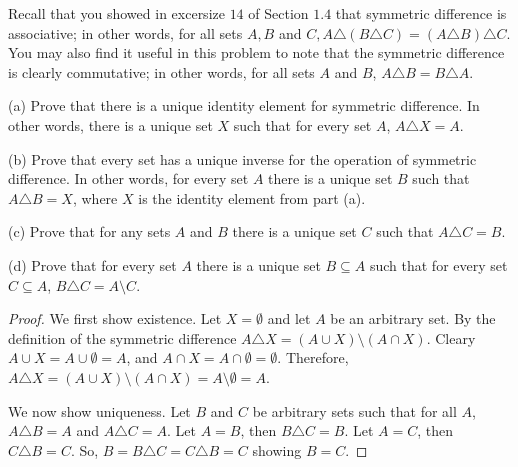 \begin{tcolorbox}[title=Problem 9, breakable]
    Recall that you showed in excersize $14$ of Section $1.4$
    that symmetric difference is associative; in other words,
    for all sets $A, B$ and $C, A \triangle (B \triangle C)
        = (A \triangle B) \triangle C$. You may also find 
    it useful in this problem to note that the symmetric 
    difference is clearly commutative; in other words,
    for all sets $A$ and $B$, $A \triangle B = B \triangle A$.

    (a) Prove that there is a unique identity element for symmetric 
    difference. In other words, there is a unique set $X$
    such that for every set $A$, $A \triangle X = A$.

    (b) Prove that every set has a unique inverse for the operation
    of symmetric difference. In other words, for every set $A$ there 
    is a unique set $B$ such that $A \triangle B = X$, where $X$
    is the identity element from part (a).

    (c) Prove that for any sets $A$ and $B$ there is a unique 
    set $C$ such that $A \triangle C = B$.

    (d) Prove that for every set $A$ there is a unique set $B \subseteq A$
    such that for every set $C \subseteq A$, $B \triangle C = A \setminus C$.
\end{tcolorbox}

\begin{proof}
    We first show existence.
    Let $X = \emptyset$ and let $A$ be an arbitrary set.
    By the definition of the symmetric difference 
    $A \triangle X = (A \cup X) \setminus (A \cap X)$.
    Cleary $A \cup X = A \cup \emptyset = A$,
    and $A \cap X = A \cap \emptyset = \emptyset$.
    Therefore, $A \triangle X = (A \cup X) \setminus (A \cap X) =  A \setminus \emptyset = A$.

    We now show uniqueness. Let $B$ and $C$ be arbitrary sets such that for all
    $A$, $A \triangle B = A$ and $A \triangle C = A$. Let $A = B$, then $B
        \triangle C = B$. Let $A = C$, then $C \triangle B = C$. So, $B = B \triangle C
        = C \triangle B = C$ showing $B = C$.
\end{proof}

